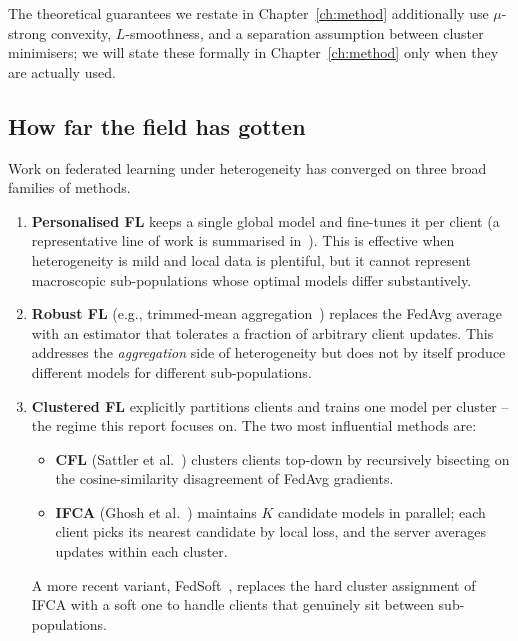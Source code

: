 The theoretical guarantees we restate in Chapter~\ref{ch:method} additionally use $\mu$-strong convexity, $L$-smoothness, and a separation assumption between cluster minimisers; we will state these formally in Chapter~\ref{ch:method} only when they are actually used.

\subsection*{How far the field has gotten}

Work on federated learning under heterogeneity has converged on three broad families of methods.

\begin{enumerate}
    \item \textbf{Personalised FL} keeps a single global model and fine-tunes it per client (a representative line of work is summarised in~\parencite{li2020heterogeneity}). This is effective when heterogeneity is mild and local data is plentiful, but it cannot represent macroscopic sub-populations whose optimal models differ substantively.
    \item \textbf{Robust FL} (e.g., trimmed-mean aggregation~\parencite{yin2018trimmedmean}) replaces the FedAvg average with an estimator that tolerates a fraction of arbitrary client updates. This addresses the \emph{aggregation} side of heterogeneity but does not by itself produce different models for different sub-populations.
    \item \textbf{Clustered FL} explicitly partitions clients and trains one model per cluster -- the regime this report focuses on. The two most influential methods are:
    \begin{itemize}
        \item \textbf{CFL} (Sattler et al.~\parencite{sattler2021cfl}) clusters clients top-down by recursively bisecting on the cosine-similarity disagreement of FedAvg gradients.
        \item \textbf{IFCA} (Ghosh et al.~\parencite{ghosh2022ifca}) maintains $K$ candidate models in parallel; each client picks its nearest candidate by local loss, and the server averages updates within each cluster.
    \end{itemize}
    A more recent variant, FedSoft~\parencite{ruan2022fedsoft}, replaces the hard cluster assignment of IFCA with a soft one to handle clients that genuinely sit between sub-populations.
\end{enumerate}

